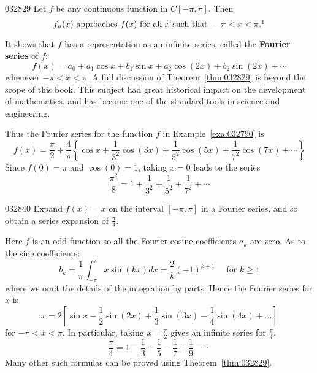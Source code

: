 \begin{theorem}{}{032829}
Let $f$ be any continuous function in $C[-\pi, \pi]$. Then
\begin{equation*}
f_n(x) \mbox{ approaches } f(x) \mbox{ for all } x \mbox{ such that } -\pi < x < \pi.  \footnotemark
\end{equation*}
\end{theorem}

\noindent It shows that $f$ has a representation as an infinite series, called the \textbf{Fourier series} of $f$:
\begin{equation*}
f(x) = a_0 + a_1 \cos x + b_1 \sin x + a_2 \cos(2x) + b_2 \sin(2x) + \cdots
\end{equation*}
whenever $-\pi < x < \pi$. A full discussion of Theorem~\ref{thm:032829} is beyond the scope of this book. This subject had great historical impact on the development of mathematics, and has become one of the standard tools in science and engineering.

Thus the Fourier series for the function $f$ in Example~\ref{exa:032790} is
\begin{equation*}
f(x) = \frac{\pi}{2} + \frac{4}{\pi}\left\{\cos x + 
\frac{1}{3^2} \cos(3x) + 
\frac{1}{5^2} \cos(5x) + 
\frac{1}{7^2} \cos(7x) + \cdots 
\right\}
\end{equation*}
Since $f(0) = \pi$ and $\cos(0) = 1$, taking $x = 0$ leads to the series
\begin{equation*}
\frac{\pi^2}{8} = 1 + \frac{1}{3^2} + \frac{1}{5^2} + \frac{1}{7^2} + \cdots
\end{equation*}

\vspace*{-1em}\begin{example}{}{032840}
Expand $f(x) = x$ on the interval $[-\pi, \pi]$ in a Fourier series, and so obtain a series expansion of $\frac{\pi}{4}$.

\begin{solution}
Here $f$ is an odd function so all the Fourier cosine coefficients $a_{k}$ are zero. As to the sine coefficients:
\begin{equation*}
b_k = \frac{1}{\pi} \int_{-\pi}^{\pi} x \sin(kx)dx = \frac{2}{k}(-1)^{k + 1} \quad \mbox{ for } k \geq 1
\end{equation*}
where we omit the details of the integration by parts. Hence the Fourier series for $x$ is
\begin{equation*}
x = 2[\sin x - \frac{1}{2} \sin(2x) + \frac{1}{3} \sin(3x) - \frac{1}{4} \sin(4x) + \dots]
\end{equation*}
for $-\pi < x < \pi$. In particular, taking $x = \frac{\pi}{2}$ gives an infinite series for $\frac{\pi}{4}$.
\begin{equation*}
\frac{\pi}{4} = 1 - \frac{1}{3} + \frac{1}{5} - \frac{1}{7} + \frac{1}{9} - \cdots
\end{equation*}
Many other such formulas can be proved using Theorem~\ref{thm:032829}.
\end{solution}
\end{example}

